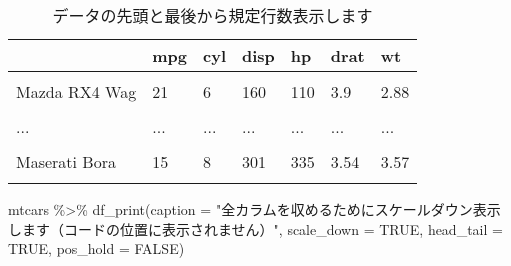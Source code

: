 \documentclass[
  12pt,
  a4paper,
  xelatex,
  ja=standard]{bxjsarticle}
\newenvironment{Shaded}{\begin{snugshade}}{\end{snugshade}}
\newcommand{\AttributeTok}[1]{\textcolor[rgb]{0.77,0.63,0.00}{#1}}
\newcommand{\ConstantTok}[1]{\textcolor[rgb]{0.00,0.00,0.00}{#1}}
\newcommand{\FunctionTok}[1]{\textcolor[rgb]{0.00,0.00,0.00}{#1}}
\newcommand{\NormalTok}[1]{#1}
\newcommand{\SpecialCharTok}[1]{\textcolor[rgb]{0.00,0.00,0.00}{#1}}
\newcommand{\StringTok}[1]{\textcolor[rgb]{0.31,0.60,0.02}{#1}}
\begin{document}
\begin{table}[H]

\caption{\label{tab:unnamed-chunk-1}データの先頭と最後から規定行数表示します}
\centering
\begin{tabular}[t]{lllllll}
\toprule
  & mpg & cyl & disp & hp & drat & wt\\
\midrule
\cellcolor{gray!6}{Mazda RX4} & \cellcolor{gray!6}{21} & \cellcolor{gray!6}{6} & \cellcolor{gray!6}{160} & \cellcolor{gray!6}{110} & \cellcolor{gray!6}{3.9} & \cellcolor{gray!6}{2.62}\\
Mazda RX4 Wag & 21 & 6 & 160 & 110 & 3.9 & 2.88\\
\cellcolor{gray!6}{Datsun 710} & \cellcolor{gray!6}{22.8} & \cellcolor{gray!6}{4} & \cellcolor{gray!6}{108} & \cellcolor{gray!6}{93} & \cellcolor{gray!6}{3.85} & \cellcolor{gray!6}{2.32}\\
... & ... & ... & ... & ... & ... & ...\\
\cellcolor{gray!6}{Ferrari Dino} & \cellcolor{gray!6}{19.7} & \cellcolor{gray!6}{6} & \cellcolor{gray!6}{145} & \cellcolor{gray!6}{175} & \cellcolor{gray!6}{3.62} & \cellcolor{gray!6}{2.77}\\
\addlinespace
Maserati Bora & 15 & 8 & 301 & 335 & 3.54 & 3.57\\
\cellcolor{gray!6}{Volvo 142E} & \cellcolor{gray!6}{21.4} & \cellcolor{gray!6}{4} & \cellcolor{gray!6}{121} & \cellcolor{gray!6}{109} & \cellcolor{gray!6}{4.11} & \cellcolor{gray!6}{2.78}\\
\bottomrule
\end{tabular}
\end{table}

\begin{Shaded}
\begin{Highlighting}[numbers=left,,]
\NormalTok{mtcars }\SpecialCharTok{\%\textgreater{}\%} 
  \FunctionTok{df\_print}\NormalTok{(}\AttributeTok{caption =} \StringTok{"全カラムを収めるためにスケールダウン表示します（コードの位置に表示されません）"}\NormalTok{,}
           \AttributeTok{scale\_down =} \ConstantTok{TRUE}\NormalTok{, }\AttributeTok{head\_tail =} \ConstantTok{TRUE}\NormalTok{, }\AttributeTok{pos\_hold =} \ConstantTok{FALSE}\NormalTok{)}
\end{Highlighting}
\end{Shaded}
\end{document}
